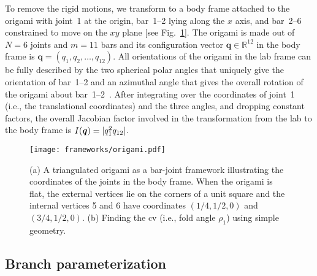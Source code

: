 To remove the rigid motions, we transform to a body frame attached to the origami with joint~1 at the origin, bar~1--2 lying along the $x$ axis, and bar~2--6 constrained to move on the $xy$ plane [see Fig.~\ref{fig:origami}].
The origami is made out of $N = 6$ joints and $m = 11$ bars and its configuration vector $\bm{q} \in \mathbb{R}^{12}$ in the body frame is $\bm{q} = (q_{1}, q_{2}, \ldots, q_{12})$.
All orientations of the origami in the lab frame can be fully described by the two spherical polar angles that uniquely give the orientation of bar~1--2 and an azimuthal angle that gives the overall rotation of the origami about bar~1--2~\cite{herschbach1959}.
After integrating over the coordinates of joint~1 (i.e., the translational coordinates) and the three angles, and dropping constant factors, the overall Jacobian factor involved in the transformation from the lab to the body frame is $I(\bm{q}) = \lvert q_1^2 q_{12}\rvert$.
%
\begin{figure}
  \begin{center}
    \texttt{[image: frameworks/origami.pdf]}
  \end{center}
  \caption{(a) A triangulated origami as a bar-joint framework illustrating the coordinates of the joints in the body frame. When the origami is flat, the external vertices lie on the corners of a unit square and the internal vertices 5 and 6 have coordinates $(1/4,1/2,0)$ and $(3/4,1/2,0)$. (b) Finding the \ac{cv} (i.e., fold angle $\rho_{1}$) using simple geometry.}
  \label{fig:origami}
\end{figure}

\subsection{Branch parameterization}

